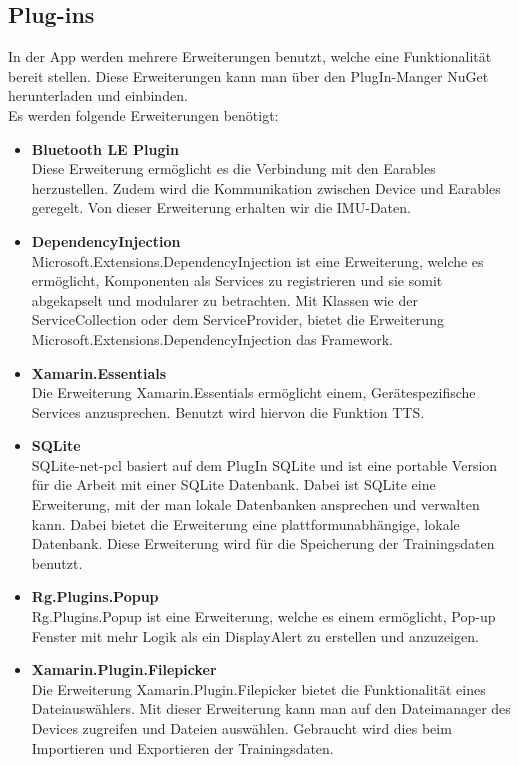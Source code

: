 \documentclass[a4paper,12pt]{article}
\begin{document}
\subsection{Plug-ins}
In der App werden mehrere Erweiterungen benutzt, welche eine Funktionalität bereit stellen. Diese Erweiterungen kann man über den PlugIn-Manger \Gls{NuGet} herunterladen und einbinden. \\
Es werden folgende Erweiterungen benötigt:\\
\begin{itemize}
	\item \textbf{\Gls{Bluetooth LE Plugin}}\\Diese Erweiterung ermöglicht es die Verbindung mit den \Gls{Earables} herzustellen. Zudem wird die Kommunikation zwischen Device und \Gls{Earables} geregelt. Von dieser Erweiterung erhalten wir die \Gls{IMU}-Daten.

	\item \textbf{\Gls{DependencyInjection}}\\Microsoft.Extensions.DependencyInjection ist eine Erweiterung, welche es ermöglicht, Komponenten als Services zu registrieren und sie somit abgekapselt und modularer zu betrachten. Mit Klassen wie der ServiceCollection oder dem ServiceProvider, bietet die Erweiterung Microsoft.Extensions.DependencyInjection das Framework.
	\item \textbf{\Gls{Xamarin.Essentials}}\\Die Erweiterung Xamarin.Essentials ermöglicht einem, Gerätespezifische Services anzusprechen. Benutzt wird hiervon die Funktion \Gls{TTS}. 
	\item \textbf{\Gls{SQLite}}\\SQLite-net-pcl basiert auf dem PlugIn SQLite und ist eine portable Version für die Arbeit mit einer SQLite Datenbank. Dabei ist SQLite eine Erweiterung, mit der man lokale Datenbanken ansprechen und verwalten kann. Dabei bietet die Erweiterung eine plattformunabhängige, lokale Datenbank. Diese Erweiterung wird für die Speicherung der Trainingsdaten benutzt.
	\item \textbf{\Gls{Rg.Plugins.Popup}}\\Rg.Plugins.Popup ist eine Erweiterung, welche es einem ermöglicht, Pop-up Fenster mit mehr Logik als ein DisplayAlert zu erstellen und anzuzeigen.
	\item \textbf{\Gls{Xamarin.Plugin.Filepicker}}\\Die Erweiterung Xamarin.Plugin.Filepicker bietet die Funktionalität eines Dateiauswählers. Mit dieser Erweiterung kann man auf den Dateimanager des Devices zugreifen und Dateien auswählen. Gebraucht wird dies beim Importieren und Exportieren der Trainingsdaten.

\end{itemize}
\end{document}
